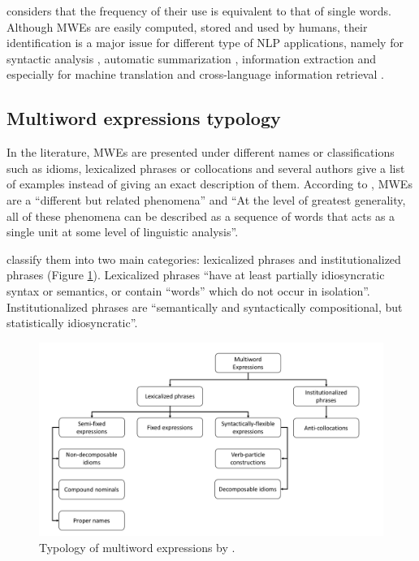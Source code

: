 \documentclass[output=paper,modfonts,nonflat]{langsci/langscibook}
\begin{document}
\cite{jackendoff1997architecture} considers that the frequency of their use is equivalent to that of single words.
Although MWEs are easily computed, stored and used by humans, their identification is a major issue for different type of NLP applications, namely for syntactic analysis \citep{nivre2004multiword,constant2011integrer}, automatic summarization \citep{hogan2007exploiting}, information extraction \citep{vechtomova2005role} and especially for machine translation and cross-language information retrieval \citep{carpuat2010task,ren2009improving}.

\subsection{Multiword expressions typology}

In the literature, MWEs are presented under different names or classifications such as idioms, lexicalized phrases or collocations and several authors \citep{ramisch2013introduction} give a list of examples instead of giving an exact description of them.
According to \cite{calzolari2002}, MWEs are a ``different but related phenomena'' and ``At the level of greatest generality, all of these phenomena can be described as a sequence of words that acts as a single unit at some level of linguistic analysis''.

\cite{sag02} classify them into two main categories: lexicalized phrases and institutionalized phrases (Figure \ref{fig:TypoMWE}).
Lexicalized phrases ``have at least partially idiosyncratic syntax or semantics, or contain ``words'' which do not occur in isolation''.
Institutionalized phrases are ``semantically and syntactically compositional, but statistically idiosyncratic''.

\begin{figure}
\includegraphics[width=\linewidth]{figures/figureTypologyMWE_NB.pdf}
\caption{\label{fig:TypoMWE}Typology of multiword expressions by \cite{Sag02}.}
\end{figure}
\end{document}

